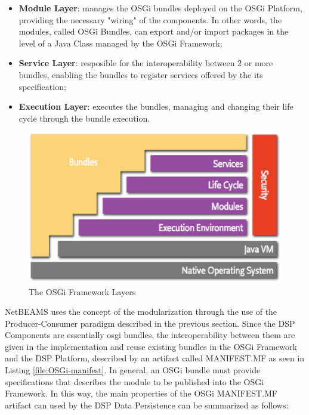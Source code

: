 \begin{itemize}
  \item \textbf{Module Layer}: manages the OSGi bundles deployed on the
  OSGi Platform, providing the necessary "wiring" of the components. In other words,
  the modules, called OSGi Bundles, can export and/or import packages in the
  level of a Java Class managed by the OSGi Framework;
  \item \textbf{Service Layer}: resposible for the interoperability between 2
  or more bundles, enabling the bundles to register services offered by
  the its specification;
  \item \textbf{Execution Layer}: executes the bundles, managing and changing
  their life cycle through the bundle execution.
\end{itemize}

\begin{figure}[!h]
  \centering
  \includegraphics[scale=0.5]{../diagrams/layering-osgi}
  \caption{The OSGi Framework Layers}
  \label{fig:layering-osgi}
\end{figure}

NetBEAMS uses the concept of the modularization through the use of the
Producer-Consumer paradigm described in the previous section. Since the DSP
Components are essentially osgi bundles, the interoperability between
them are given in the implementation and reuse existing bundles in the
OSGi Framework and the DSP Platform, described by an artifact called
MANIFEST.MF as seen in Listing \ref{file:OSGi-manifest}. In general, an
OSGi bundle must provide specifications that describes the module to be
published into the OSGi Framework. In this way, the main properties of
the OSGi MANIFEST.MF artifact can used by the DSP Data Persistence can
be summarized as follows:

